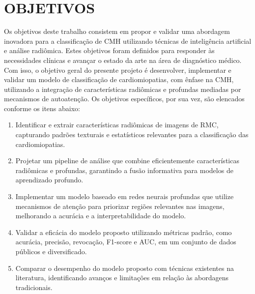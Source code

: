 \section{OBJETIVOS}
\label{sec:cap1_objetivo}

Os objetivos deste trabalho consistem em propor e validar uma abordagem inovadora para a classificação de \gls{CMH} utilizando técnicas de inteligência artificial e análise radiômica. Estes objetivos foram definidos para responder às necessidades clínicas e avançar o estado da arte na área de diagnóstico médico. Com isso, o objetivo geral do presente projeto é desenvolver, implementar e validar um modelo de classificação de cardiomiopatias, com ênfase na \gls{CMH}, utilizando a integração de características radiômicas e profundas mediadas por mecanismos de autoatenção. Os objetivos específicos, por sua vez, são elencados conforme os itens abaixo:


\begin{enumerate}
\item Identificar e extrair características radiômicas de imagens de \gls{RMC}, capturando padrões texturais e estatísticos relevantes para a classificação das cardiomiopatias.

\item Projetar um pipeline de análise que combine eficientemente características radiômicas e profundas, garantindo a fusão informativa para modelos de aprendizado profundo.

\item Implementar um modelo baseado em redes neurais profundas que utilize mecanismos de atenção para priorizar regiões relevantes nas imagens, melhorando a acurácia e a interpretabilidade do modelo.

\item Validar a eficácia do modelo proposto utilizando métricas padrão, como acurácia, precisão, revocação, F1-score e \gls{AUC}, em um conjunto de dados públicos e diversificado.

\item Comparar o desempenho do modelo proposto com técnicas existentes na literatura, identificando avanços e limitações em relação às abordagens tradicionais.
\end{enumerate}


